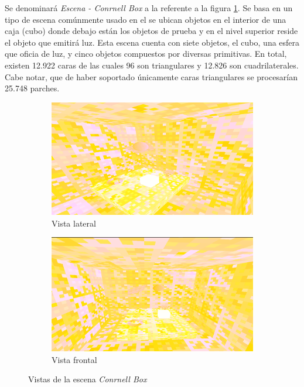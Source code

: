 Se denominará \textit{Escena - Conrnell Box} a la referente a la figura \ref{img:cornell}. Se basa en un tipo de escena comúnmente usado en el se ubican objetos en el interior de una caja (cubo) donde debajo están los objetos de prueba y en el nivel superior reside el objeto que emitirá luz. Esta escena cuenta con siete objetos, el cubo, una esfera que oficia de luz, y cinco objetos compuestos por diversas primitivas. En total, existen 12.922 caras de las cuales 96 son triangulares y 12.826 son cuadrilaterales. Cabe notar, que de haber soportado únicamente caras triangulares se procesarían 25.748 parches.

\begin{figure}[H]
	\centering
	\begin{subfigure}{0.45\textwidth}
		\includegraphics[width=1\linewidth]{assets/cornell}
		\caption{Vista lateral}
	\end{subfigure}
	\begin{subfigure}{0.45\textwidth}
		\includegraphics[width=1\linewidth]{assets/cornell2}
		\caption{Vista frontal}
	\end{subfigure}
	\caption{Vistas de la escena \textit{Conrnell Box}}
	\label{img:cornell}
\end{figure}

